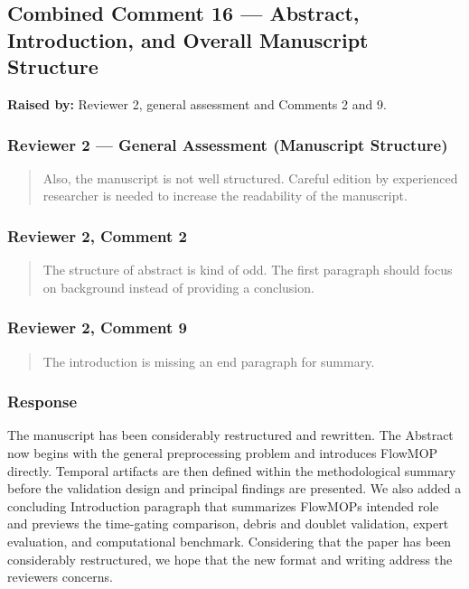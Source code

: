 \documentclass[
  11pt,
  a4paper,
]{article}
\begin{document}
\subsection{Combined Comment 16 --- Abstract, Introduction, and Overall
Manuscript
Structure}\label{combined-comment-16--abstract-introduction-and-overall-manuscript-structure}

\textbf{Raised by:} Reviewer 2, general assessment and Comments 2 and 9.

\subsubsection{Reviewer 2 --- General Assessment (Manuscript
Structure)}\label{reviewer-2--general-assessment-manuscript-structure}

\begin{quote}
Also, the manuscript is not well structured. Careful edition by
experienced researcher is needed to increase the readability of the
manuscript.
\end{quote}

\subsubsection{Reviewer 2, Comment 2}\label{reviewer-2-comment-2}

\begin{quote}
The structure of abstract is kind of odd. The first paragraph should
focus on background instead of providing a conclusion.
\end{quote}

\subsubsection{Reviewer 2, Comment 9}\label{reviewer-2-comment-9}

\begin{quote}
The introduction is missing an end paragraph for summary.
\end{quote}

\subsubsection{Response}\label{response-15}

The manuscript has been considerably restructured and rewritten. The
Abstract now begins with the general preprocessing problem and
introduces FlowMOP directly. Temporal artifacts are then defined within
the methodological summary before the validation design and principal
findings are presented. We also added a concluding Introduction
paragraph that summarizes FlowMOP\textquotesingle s intended role and
previews the time-gating comparison, debris and doublet validation,
expert evaluation, and computational benchmark. Considering that the
paper has been considerably restructured, we hope that the new format
and writing address the reviewer\textquotesingle s concerns.
\end{document}

